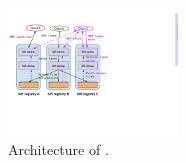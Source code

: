\begin{figure}[t]
	\centering
			\centering
			\includegraphics[width=0.4\textwidth]{graphs/fig-sys-architecture}
			\caption{Architecture of \sysname.}
		\label{fig:sys-overview}
\end{figure}
